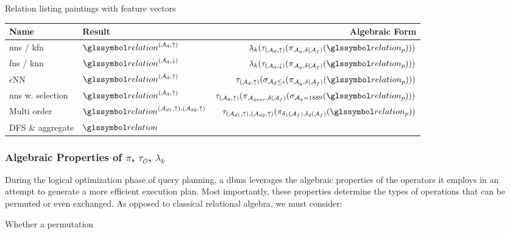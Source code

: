 \begin{example}[label=example:rel_painting_w_features]{Relation listing paintings with feature vectors}{}
    \begin{center}
        \begin{tabular}{||l l r ||} 
         \hline
         Name & Result & Algebraic Form \\
         \hline\hline
         \acrshort{nns} / \acrshort{kfn} & $\relation^{(\mathcal{A}_d,\uparrow)}$ & $\lambda_k (\tau_{(\mathcal{A}_d,\uparrow)} ( \pi_{\mathcal{A}_{y}, \delta(\mathcal{A}_{f})}  ( \relation_p)))$  \\ 
         \hline
         \acrshort{fns} / \acrshort{knn}& $\relation^{(\mathcal{A}_d,\downarrow)}$ & $\lambda_k (\tau_{(\mathcal{A}_d,\downarrow)} ( \pi_{\mathcal{A}_{y}, \delta(\mathcal{A}_{f})}  ( \relation_p)))$   \\
         \hline
         $\epsilon$NN & $\relation^{(\mathcal{A}_d,\uparrow)}$ & $\tau_{(\mathcal{A}_d,\uparrow)} ( \sigma_{\mathcal{A}_d \leq \epsilon} ( \pi_{\mathcal{A}_{y}, \delta(\mathcal{A}_{f})} ( \relation_p)) )$  \\
         \hline
         \acrshort{nns} w. selection & $\relation^{(\mathcal{A}_d,\uparrow)}$ &  $\tau_{(\mathcal{A}_d,\uparrow)} ( \pi_{\mathcal{A}_{year}, \delta(\mathcal{A}_{f})} ( \sigma_{\mathcal{A}_{y} = 1889} ( \relation_p)) )$\\
         \hline
         Multi order & $\relation^{(\mathcal{A}_{d1},\uparrow),(\mathcal{A}_{d2},\uparrow)}$ & $\tau_{(\mathcal{A}_{d1},\uparrow),(\mathcal{A}_{d2},\uparrow)} ( \pi_{\delta_1(\mathcal{A}_{f}), \delta_2(\mathcal{A}_{f})}  ( \relation_p))$ \\ 
         \hline
         DFS \& aggregate & $\relation$ & \\ 
         \hline
        \end{tabular}
    \end{center}

\end{example}

\subsubsection{Algebraic Properties of $\pi$, $\tau_{\mathcal{O}}$, $\lambda_k$}

During the logical optimization phase of query planning, a \acrshort{dbms} leverages the algebraic properties of the operators it employs in an attempt to generate a more efficient execution plan. Most importantly, these properties determine the types of operations that can be permuted or even exchanged. As opposed to classical relational algebra, we must consider:
\begin{enumerate*}[label=(\roman*)]
     \item Whether a permutation  
\end{enumerate*}

